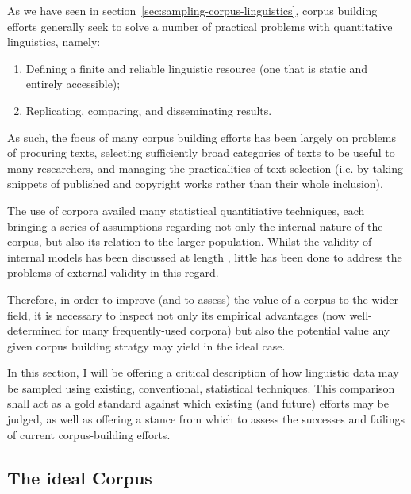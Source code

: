 As we have seen in section~\ref{sec:sampling-corpus-linguistics}, corpus building efforts generally seek to solve a number of practical problems with quantitative linguistics, namely:
\begin{enumerate}
    \item Defining a finite and reliable linguistic resource (one that is static and entirely accessible);
    \item Replicating, comparing, and disseminating results.
\end{enumerate}

As such, the focus of many corpus building efforts 
has been largely on problems of procuring texts, selecting sufficiently broad categories of texts to be useful to many researchers, and managing the practicalities of text selection (i.e. by taking snippets of published and copyright works rather than their whole inclusion).

The use of corpora availed many statistical quantitiative techniques, each bringing a series of assumptions regarding not only the internal nature of the corpus, but also its relation to the larger population.  Whilst the validity of internal models has been discussed at length
, little has been done to address the problems of external validity in this regard.

Therefore, in order to improve (and to assess) the value of a corpus to the wider field, it is necessary to inspect not only its empirical advantages (now well-determined for many frequently-used corpora) but also the potential value any given corpus building stratgy may yield in the ideal case.

In this section, I will be offering a critical description of how linguistic data may be sampled using existing, conventional, statistical techniques.  This comparison shall act as a gold standard against which existing (and future) efforts may be judged, as well as offering a stance from which to assess the successes and failings of current corpus-building efforts.



\subsection{The ideal Corpus}
\label{sec:sub:ideal-corpus}

